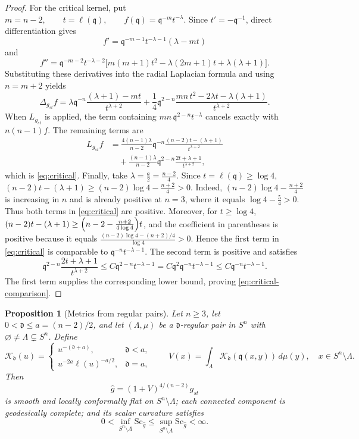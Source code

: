 \documentclass[12pt,oneside,a4paper]{article}
\newtheorem{proposition}[definition]{Proposition}
\theoremstyle{mytheorem}
\theoremstyle{remark}
\theoremstyle{definition}
\begin{document}
\begin{proof}
For the critical kernel, put
$m=n-2,\qquad t=\ell(\mathfrak q),\qquad
f(\mathfrak q)=\mathfrak q^{-m}t^{-\lambda}$.
Since $t'=-\mathfrak q^{-1}$, direct differentiation gives
\[
 f'
 =\mathfrak q^{-m-1}t^{-\lambda-1}(\lambda-mt)
\]
and
\[
 f''
 =\mathfrak q^{-m-2}t^{-\lambda-2}
 \bigl[m(m+1)t^2-\lambda(2m+1)t+\lambda(\lambda+1)\bigr].
\]
Substituting these derivatives into the radial Laplacian formula and
using $n=m+2$ yields
\[
 \Delta_{g_{st}}f
 =\lambda \mathfrak q^{-n}\frac{(\lambda+1)-mt}{t^{\lambda+2}}
 +\frac14\mathfrak q^{2-n}
   \frac{mn\,t^2-2\lambda t-\lambda(\lambda+1)}{t^{\lambda+2}}.
\]
When $L_{g_{st}}$ is applied, the term containing
$mn\,\mathfrak q^{2-n}t^{-\lambda}$ cancels exactly with
$n(n-1)f$.  The remaining terms are
\begin{align*}
 L_{g_{st}}f
 &=\frac{4(n-1)\lambda}{n-2}\mathfrak q^{-n}
   \frac{(n-2)t-(\lambda+1)}{t^{\lambda+2}}\\
 &\quad+
 \frac{(n-1)\lambda}{n-2}\mathfrak q^{2-n}
   \frac{2t+\lambda+1}{t^{\lambda+2}},
\end{align*}
which is \eqref{eq:critical}.  Finally, take
$\lambda=\frac a2=\frac{n-2}{4}$.  Since $t=\ell(\mathfrak q)\ge\log4$,
\((n-2)t-(\lambda+1)
\ge(n-2)\log4-\frac{n+2}{4}>0\).
Indeed, $(n-2)\log 4-\tfrac{n+2}{4}$ is increasing in $n$ and is already positive at $n=3$, where it equals $\log 4-\tfrac54>0$.  Thus both terms in \eqref{eq:critical} are
positive.  Moreover, for $t\ge\log4$,
\((n-2)t-(\lambda+1)\ge
\Bigl(n-2-\frac{n+2}{4\log4}\Bigr)t\),
and the coefficient in parentheses is positive because it equals
\(\frac{(n-2)\log4-(n+2)/4}{\log4}>0\).
Hence the first term in \eqref{eq:critical} is comparable to
$\mathfrak q^{-n}t^{-\lambda-1}$.  The second term is positive and satisfies
\[
 \mathfrak q^{2-n}\frac{2t+\lambda+1}{t^{\lambda+2}}
 \le C\mathfrak q^{2-n}t^{-\lambda-1}
 =C\mathfrak q^2\mathfrak q^{-n}t^{-\lambda-1}
 \le C\mathfrak q^{-n}t^{-\lambda-1}.
\]
The first term supplies the corresponding lower bound, proving
\eqref{eq:critical-comparison}.
\end{proof}

\begin{proposition}[Metrics from regular pairs]\label{prop:metric}
Let $n\ge3$, let $0<\mathfrak d\le a=(n-2)/2$, and let $(\Lambda,\mu)$ be a
$\mathfrak d$-regular pair in $S^n$ with
$\varnothing\ne\Lambda\subsetneq S^n$.  Define
\[
 \mathcal{K}_{\mathfrak d}(u)=
 \begin{cases}
  u^{-(\mathfrak d+a)},&\mathfrak d<a,\\[2mm]
  u^{-2a}\ell(u)^{-a/2},&\mathfrak d=a,
 \end{cases}
 \qquad
 V(x)=\int_\Lambda \mathcal{K}_{\mathfrak d}(\mathfrak q(x,y))\,d\mu(y),
 \quad x\in S^n\setminus\Lambda.
\]
Then
\begin{equation}\label{eq:metric}
 \widehat g=(1+V)^{4/(n-2)}g_{st}
\end{equation}
is smooth and locally conformally flat on $S^n\setminus\Lambda$; each
connected component is geodesically complete; and its scalar curvature
satisfies
\[
 0<\inf_{S^n\setminus\Lambda}\mathrm{Sc}_{\widehat g}
 \le\sup_{S^n\setminus\Lambda}\mathrm{Sc}_{\widehat g}<\infty.
\]
\end{proposition}
\end{document}
